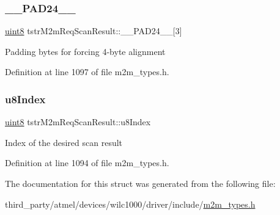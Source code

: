 \subsubsection{\texorpdfstring{\+\_\+\+\_\+\+P\+A\+D24\+\_\+\+\_\+}{\_\_PAD24\_\_}}
{\footnotesize\ttfamily \hyperlink{group__DataT_ga4df709a77647e870bbf1d955b8edc9a6}{uint8} tstr\+M2m\+Req\+Scan\+Result\+::\+\_\+\+\_\+\+P\+A\+D24\+\_\+\+\_\+\mbox{[}3\mbox{]}}

Padding bytes for forcing 4-\/byte alignment 

Definition at line 1097 of file m2m\+\_\+types.\+h.

\mbox{\label{structtstrM2mReqScanResult_a7f09d082424b29064faa67a51a633853}} 
\subsubsection{\texorpdfstring{u8\+Index}{u8Index}}
{\footnotesize\ttfamily \hyperlink{group__DataT_ga4df709a77647e870bbf1d955b8edc9a6}{uint8} tstr\+M2m\+Req\+Scan\+Result\+::u8\+Index}

Index of the desired scan result 

Definition at line 1094 of file m2m\+\_\+types.\+h.



The documentation for this struct was generated from the following file\+:\begin{DoxyCompactItemize}
\item 
third\+\_\+party/atmel/devices/wilc1000/driver/include/\hyperlink{m2m__types_8h}{m2m\+\_\+types.\+h}\end{DoxyCompactItemize}
